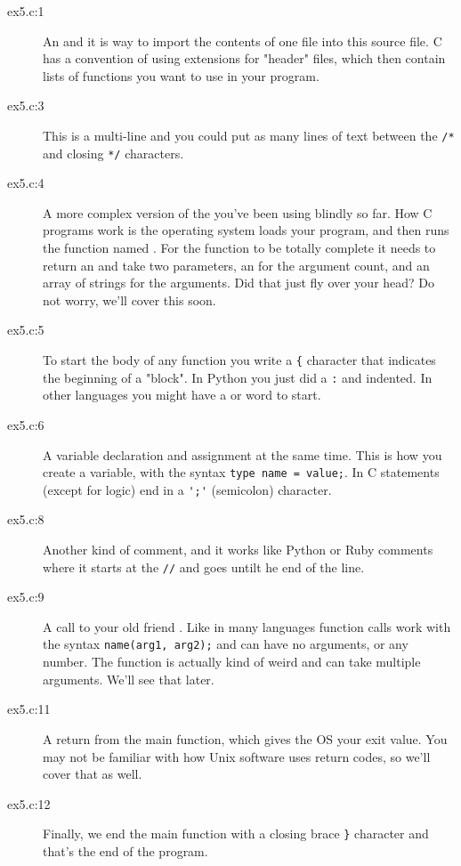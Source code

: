\begin{description}
\item[ex5.c:1] An  and it is way to import the contents
    of one file into this source file.  C has a convention of using 
     extensions for "header" files, which then contain lists
    of functions you want to use in your program.
\item[ex5.c:3] This is a multi-line  and you could put as many
    lines of text between the \verb|/*| and closing \verb|*/| characters.
\item[ex5.c:4] A more complex version of the  you've
    been using blindly so far.  How C programs work is the operating system
    loads your program, and then runs the function named .
    For the function to be totally complete it needs to return an 
    and take two parameters, an  for the argument count, and
    an array of  strings for the arguments.  Did that
    just fly over your head?  Do not worry, we'll cover this soon.
\item[ex5.c:5] To start the body of any function you write a \verb|{| character
    that indicates the beginning of a "block".  In Python you just
    did a \verb|:| and indented. In other languages you might have a
     or  word to start.
\item[ex5.c:6] A variable declaration and assignment at the same time.
    This is how you create a variable, with the syntax \verb|type name = value;|.  In C statements (except for logic) end in a \verb|';'| (semicolon) character.
\item[ex5.c:8] Another kind of comment, and it works like Python or 
    Ruby comments where it starts at the \verb|//| and goes untilt he end of 
    the line.
\item[ex5.c:9] A call to your old friend .  Like in many languages
    function calls work with the syntax \verb|name(arg1, arg2);| and can have
    no arguments, or any number.  The  function is actually
    kind of weird and can take multiple arguments. We'll see that later.
\item[ex5.c:11] A return from the main function, which gives the OS your exit
    value.  You may not be familiar with how Unix software uses return
    codes, so we'll cover that as well.
\item[ex5.c:12] Finally, we end the main function with a closing brace \verb|}|
    character and that's the end of the program.
\end{description}

